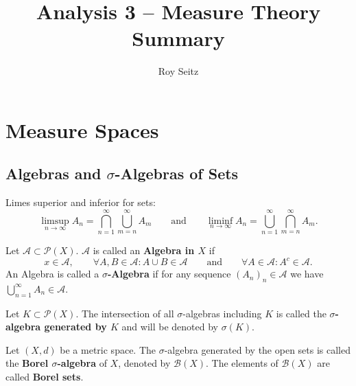 

\author{Roy Seitz}
\title{Analysis 3 -- Measure Theory\\Summary}

\maketitle
\tableofcontents

\section{Measure Spaces}
\subsection{Algebras and $\sigma$-Algebras of Sets}

\begin{definition}
  Limes superior and inferior for sets:
  \[
  \limsup_{n \to \infty} A_n = \bigcap_{n=1}^\infty \bigcup_{m=n}^\infty A_m
  \qquad\text{and}\qquad
  \liminf_{n \to \infty} A_n = \bigcup_{n=1}^\infty \bigcap_{m=n}^\infty A_m.
  \]
\end{definition}

\begin{definition}
  Let $\mathcal A \subset \mathcal P(X)$.
  $\mathcal A$ is called an \textbf{Algebra in $X$} if
  \[
    x \in \mathcal A,
    \qquad
    \forall A, B \in \mathcal A\colon A \cup B \in \mathcal A
    \qquad\text{and}\qquad
    \forall A \in \mathcal A\colon A^c \in \mathcal A.
  \]
  An Algebra is called a \textbf{$\sigma$-Algebra} if for any sequence $(A_n)_n \in \mathcal A$ we have
  $\bigcup_{n=1}^\infty A_n \in \mathcal A$.
\end{definition}

\begin{definition}
  Let $K \subset \mathcal P(X)$.
  The intersection of all $\sigma$-algebras including $K$ is called the
  \textbf{$\sigma$-algebra generated by $K$} and will be denoted by $\sigma(K)$.
\end{definition}

\begin{definition}
  Let $(X, d)$ be a metric space.
  The $\sigma$-algebra generated by the open sets is called the
  \textbf{Borel $\sigma$-algebra} of $X$, denoted by $\mathcal B(X)$.
  The elements of $\mathcal B(X)$ are called \textbf{Borel sets}.
\end{definition}

